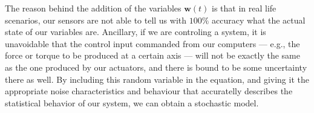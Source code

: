 \documentclass[12pt]{article}
\begin{document}
The reason behind the addition of the variables $\mathbf{w}(t)$ is that in real life scenarios, our sensors are not able to tell us with $100\%$ accuracy what the actual state of our variables are. Ancillary, if we are controling a system, it is unavoidable that the control input commanded from our computers --- e.g., the force or torque to be produced at a certain axis --- will not be exactly the same as the one produced by our actuators, and there is bound to be some uncertainty there as well. By including this random variable in the equation, and giving it the appropriate noise characteristics and behaviour that accuratelly describes the statistical behavior of our system, we can obtain a stochastic model.

 
\end{document}
